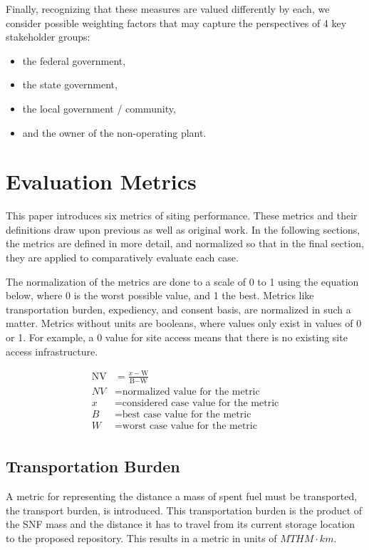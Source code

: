 Finally, recognizing that these measures are valued differently by each, we
consider possible weighting factors that may capture the perspectives of 4 key
stakeholder groups:

\begin{itemize}
	\item the federal government,
	\item the state government,
	\item the local government / community,
	\item and the owner of the non-operating plant.
\end{itemize}


\section{Evaluation Metrics}

This paper introduces six metrics of siting performance. These metrics and 
their definitions draw upon previous 
\cite{freeze_siting_2015,waleed_regional_2015} as well as original work.  In 
the following sections, the metrics are defined in more detail, and normalized
so that in the final section, they are applied to comparatively evaluate each case.

The normalization of the metrics are done to a scale of 0 to 1 using the equation
below, where 0 is the worst possible value, and 1 the best. 
 Metrics like transportation burden, expediency, and consent basis,
 are normalized in such a matter. Metrics without units are booleans, where values 
 only exist in values of 0 or 1. For example, a 0 value for site access means 
that there is no existing site access infrastructure.


\begin{align} 
	\mbox{NV} &= \frac{x-\mbox{W}}{\mbox{B}-\mbox{W}}\\
	NV &= \mbox{normalized value for the metric}\\
	x &= \mbox{considered case value for the metric}\\
	B &= \mbox{best case value for the metric}\\
	W &= \mbox{worst case value for the metric}\\
\end{align}



\subsection{Transportation Burden}
 A metric 
 for representing the distance a mass of spent fuel must be transported, the 
 transport burden, is introduced. This transportation burden is the product 
 of the \gls{SNF} mass and the distance it has to travel from its current 
 storage location to the proposed repository. This results in a 
 metric in units of $MTHM\cdot km$. 

